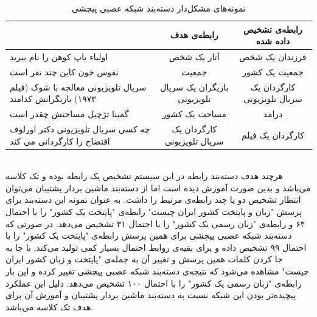 \begin{table}[h]
	\centering
	\def\arraystretch{1.7}
	\begin{tabularx}{\linewidth}{|L|c|c|}
		\hline
		&رابطه‌ی هدف&رابطه‌ی تشخیص داده شده
		\\ \hline
		\small{اولیاء یاپ کوهن را نام ببرید}&آثار یک شخص&فرزندان یک شخص
		\\ \hline
		\small{نفوس خون کاین چند نفر است}&جمعیت&جمعیت یک کشور
		\\ \hline
		\small{سریال تلویزیونی معالجه با شوک (فیلم ۱۹۷۳) بازیگرانش کدامند}& بازیگران یک سریال تلویزیونی&کارگردان یک سریال تلویزیونی
		\\ \hline
		\small{گمینا تژچیل مساحتش چقدر است}&مساحت یک کشور&درامد
		\\ \hline
		\small{چه کسی سریال تلویزیونی دکتر اورلوف افتضاح را کارگردانی می کند}&کارگردان یک سریال تلویزیونی&کارگردان یک فیلم
		\\ \hline
	\end{tabularx}	
	\caption{نمونه‌های مشکل‌دار دسته‌بند شبکه عصبی پیچشی}
	\label{tab:cnn_troubled_samples}
\end{table}
\\
هرچند هدف دسته‌بند رابطه در این سیستم تشخیص یک رابطه بوده و تک کلاسه می‌باشد و بدین صورت آموزش دیده‌ است اما از دسته‌بند ماشین بردار پشتیبان می‌توان انتظار تشخیص دو یا چند رابطه‌ی مرتبط را داشت. به عنوان نمونه این دسته‌بند برای پرسش "زبان و پایتخت کشور ایران چیست" رابطه‌ی "پایتخت یک کشور" را با احتمال ۶۴\lr{\%} و رابطه‌ی "زبان رسمی یک کشور" را با احتمال ۳۱\lr{\%} تشخیص می‌دهد. در صورتی که دسته‌بند شبکه عصبی پیچشی برای همین پرسش رابطه‌ی "پایتخت یک کشور" را با احتمال ۹۹\lr{\%} تشخیص داده و برای بقیه‌ی روابط احتمال بسیار کمی تولید می‌کند. با جا به جا کردن کلمات همین پرسش و تغییر آن به جمله‌ی "پایتخت و زبان کشور ایران چیست" مشاهده می‌شود که نتیجه‌ی دسته‌بند شبکه عصبی پیچشی تغییر کرده و این بار رابطه‌ی "زبان رسمی یک کشور" را با احتمال ۱۰۰\lr{\%} تشخیص می‌دهد. دلیل این عملکرد پیچیده‌تر بودن این شبکه نسبت به دسته‌بند ماشین بردار پشتیبان و آموزش آن برای هدف تک کلاسه می‌باشد.
